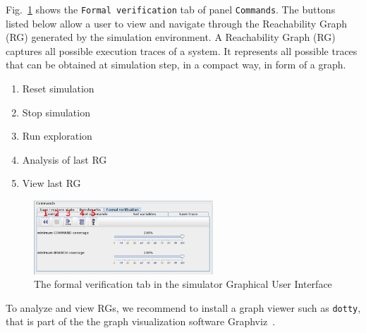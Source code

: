 \documentclass{llncs}
\begin{document}
%
Fig.~\ref{fig:CmdFormalVerif} shows the \texttt{Formal verification} tab of panel \texttt{Commands}. The buttons
listed below allow a user to view and navigate through the Reachability Graph (RG) generated by the simulation
environment. A Reachability Graph (RG) captures all possible execution traces of a system. It represents all possible
traces that can be obtained at simulation step, in a compact way, in form of a graph.
%
\begin{enumerate}
	\item Reset simulation
	\item Stop simulation
	\item Run exploration
	\item Analysis of last RG
	\item View last RG
\end{enumerate}
%
\begin{figure}[!htbp]
	\centering
	\includegraphics[width=0.6\textwidth]{figures/screenshot/CmdFormalVerif.png}
	\caption{The formal verification tab in the simulator Graphical User Interface}
	\label{fig:CmdFormalVerif}
\end{figure}
%
To analyze and view RGs, we recommend to install a graph viewer such as \texttt{dotty}, that is part of the the graph
visualization software Graphviz~\cite{Graphviz}.\\
%


\noindent
\end{document}
